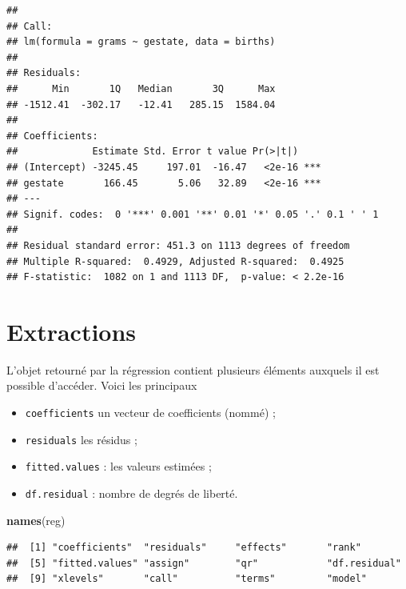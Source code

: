 \documentclass[
  11pt,
]{book}
\newenvironment{Shaded}{\begin{snugshade}}{\end{snugshade}}
\newcommand{\KeywordTok}[1]{\textcolor[rgb]{0.13,0.29,0.53}{\textbf{#1}}}
\newcommand{\NormalTok}[1]{#1}
\newcommand{\OperatorTok}[1]{\textcolor[rgb]{0.81,0.36,0.00}{\textbf{#1}}}
\providecommand{\tightlist}{%
  \setlength{\itemsep}{0pt}\setlength{\parskip}{0pt}}
\numberwithin{equation}{section}
\numberwithin{countremarque}{section}
\begin{document}
\begin{lstlisting}
## 
## Call:
## lm(formula = grams ~ gestate, data = births)
## 
## Residuals:
##      Min       1Q   Median       3Q      Max 
## -1512.41  -302.17   -12.41   285.15  1584.04 
## 
## Coefficients:
##             Estimate Std. Error t value Pr(>|t|)    
## (Intercept) -3245.45     197.01  -16.47   <2e-16 ***
## gestate       166.45       5.06   32.89   <2e-16 ***
## ---
## Signif. codes:  0 '***' 0.001 '**' 0.01 '*' 0.05 '.' 0.1 ' ' 1
## 
## Residual standard error: 451.3 on 1113 degrees of freedom
## Multiple R-squared:  0.4929, Adjusted R-squared:  0.4925 
## F-statistic:  1082 on 1 and 1113 DF,  p-value: < 2.2e-16
\end{lstlisting}

\hypertarget{regressions_extractions}{%
\section{Extractions}\label{regressions_extractions}}

L'objet retourné par la régression contient plusieurs éléments auxquels il est possible d'accéder. Voici les principaux

\begin{itemize}
\tightlist
\item
  \texttt{coefficients} un vecteur de coefficients (nommé) ;
\item
  \texttt{residuals} les résidus ;
\item
  \texttt{fitted.values} : les valeurs estimées ;
\item
  \texttt{df.residual} : nombre de degrés de liberté.
\end{itemize}

\begin{Shaded}
\begin{Highlighting}[]
\KeywordTok{names}\NormalTok{(reg)}
\end{Highlighting}
\end{Shaded}

\begin{lstlisting}
##  [1] "coefficients"  "residuals"     "effects"       "rank"         
##  [5] "fitted.values" "assign"        "qr"            "df.residual"  
##  [9] "xlevels"       "call"          "terms"         "model"
\end{lstlisting}

\begin{Shaded}
\end{Shaded}
\end{document}
